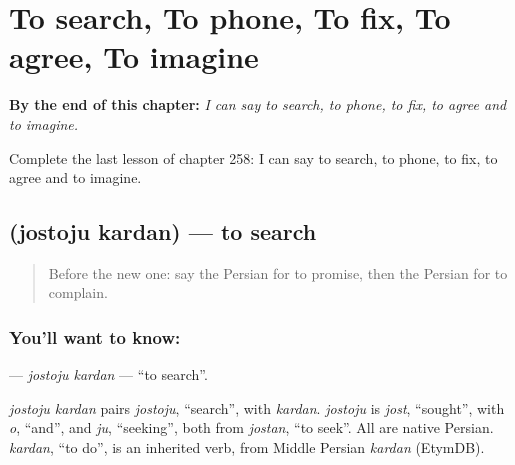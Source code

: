 
\chapter{To search, To phone, To fix, To agree, To imagine}
\label{ch:fa-to-search-to-phone-to-fix-to-agree-to-imagine}

\begin{chapteropening}
\textbf{By the end of this chapter:} \emph{I can say to search, to phone, to fix, to agree and to imagine.}

Complete the last lesson of chapter 258: I can say to search, to phone, to fix, to agree and to imagine.
\end{chapteropening}

\section[\texorpdfstring{\fa{جستجو} \fa{کردن} (jostoju kardan)}{جستجو کردن (jostoju kardan)}]{  (jostoju kardan) — to search}

\label{lesson:FA-C258-jostoju-kardan}



\begin{quote}
Before the new one: say the Persian for to promise, then the Persian for to complain.
\end{quote}

\subsection*{You'll want to know:  }
\textbf{ } — \emph{jostoju kardan} — \textquotedblleft{}to search\textquotedblright{}.

\begin{cousinweb}
\emph{jostoju kardan} pairs \emph{jostoju}, \textquotedblleft{}search\textquotedblright{}, with \emph{kardan}. \emph{jostoju} is \emph{jost}, \textquotedblleft{}sought\textquotedblright{}, with \emph{o}, \textquotedblleft{}and\textquotedblright{}, and \emph{ju}, \textquotedblleft{}seeking\textquotedblright{}, both from \emph{jostan}, \textquotedblleft{}to seek\textquotedblright{}. All are native Persian. \emph{kardan}, \textquotedblleft{}to do\textquotedblright{}, is an inherited verb, from Middle Persian \emph{kardan} (EtymDB).
\end{cousinweb}

